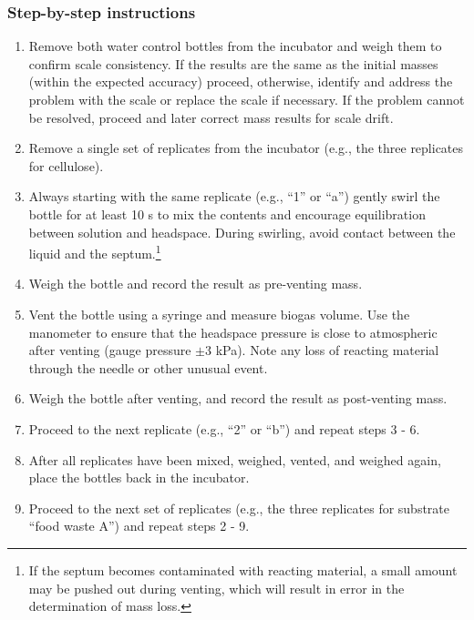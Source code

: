 \documentclass[]{article}
\begin{document}
\subsubsection{Step-by-step instructions}
\begin{enumerate}
    \item Remove both water control bottles from the incubator and weigh them to confirm scale consistency. 
      If the results are the same as the initial masses (within the expected accuracy) proceed, otherwise, identify and address the problem with the scale or replace the scale if necessary.
      If the problem cannot be resolved, proceed and later correct mass results for scale drift.
    \item Remove a single set of replicates from the incubator (e.g., the three replicates for cellulose).
    \item Always starting with the same replicate (e.g., ``1'' or ``a'') gently swirl the bottle for at least 10 s to mix the contents and encourage  equilibration between solution and headspace. 
      During swirling, avoid contact between the liquid and the septum.\footnote{
        If the septum becomes contaminated with reacting material, a small amount may be pushed out during venting, which will result in error in the determination of mass loss.}
    \item Weigh the bottle and record the result as pre-venting mass.
    \item Vent the bottle using a syringe and measure biogas volume.
      Use the manometer to ensure that the headspace pressure is close to atmospheric after venting (gauge pressure $\pm3$ kPa).
      Note any loss of reacting material through the needle or other unusual event.
    \item Weigh the bottle after venting, and record the result as post-venting mass. 
    \item Proceed to the next replicate (e.g., ``2'' or ``b'') and repeat steps 3 - 6.
    \item After all replicates have been mixed, weighed, vented, and weighed again, place the bottles back in the incubator.
    \item Proceed to the next set of replicates (e.g., the three replicates for substrate ``food waste A'') and repeat steps 2 - 9.
\end{enumerate}


\end{document}
